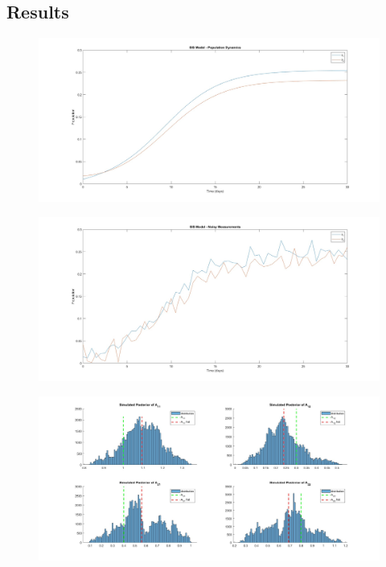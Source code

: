 \documentclass[a4paper,10pt]{report}
\begin{document}
\subsection{Results}

\begin{figure}[h!]
	\centering
	\begin{minipage}{0.49\textwidth}
		\centering
		\includegraphics[width=\textwidth]{immagini/PopDynamics1.1.jpg}
		\label{fig:immagine1}
		\caption{}
	\end{minipage}
	\hfill
	\begin{minipage}{0.49\textwidth}
		\centering
		\includegraphics[width=\textwidth]{immagini/PopDynamics2.1.jpg}
		\label{fig:immagine2}
		\caption{}
	\end{minipage}
\end{figure}
\begin{figure}[h]
	\centering
	\includegraphics[width=\linewidth]{immagini/Posterior2.jpg}
	\caption{}
\end{figure}
\end{document}
